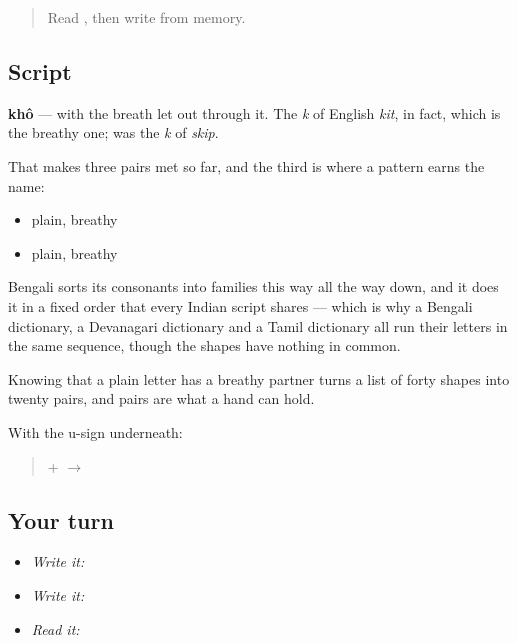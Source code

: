\begin{quote}
Read \textbf{}, then write \textbf{} from memory.
\end{quote}

\subsection*{Script}
\begin{quote}
\end{quote}

\textbf{khô} — \textbf{} with the breath let out through it. The \emph{k} of English \emph{kit}, in fact, which is the breathy one; \textbf{} was the \emph{k} of \emph{skip}.

That makes three pairs met so far, and the third is where a pattern earns the name:

\begin{itemize}
\raggedright
  \item \textbf{} plain, \textbf{} breathy
  \item \textbf{} plain, \textbf{} breathy
\end{itemize}

Bengali sorts its consonants into families this way all the way down, and it does it in a fixed order that every Indian script shares — which is why a Bengali dictionary, a Devanagari dictionary and a Tamil dictionary all run their letters in the same sequence, though the shapes have nothing in common.

Knowing that a plain letter has a breathy partner turns a list of forty shapes into twenty pairs, and pairs are what a hand can hold.

With the u-sign underneath:

\begin{quote}
\textbf{} + \textbf{} $\to$ \textbf{}
\end{quote}

\subsection*{Your turn}
\begin{itemize}
\raggedright
  \item \emph{Write it:} 
  \item \emph{Write it:}  
  \item \emph{Read it:} 
\end{itemize}

